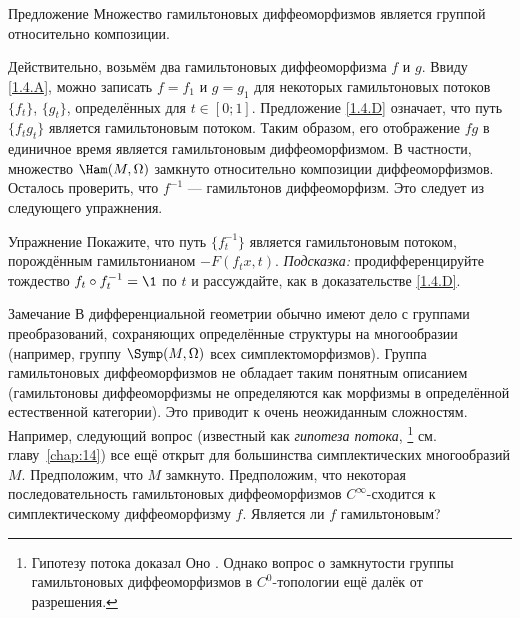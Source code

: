 \begin{thm}{Предложение}
Множество гамильтоновых диффеоморфизмов является группой относительно композиции.
\end{thm}

Действительно, возьмём два гамильтоновых диффеоморфизма $f$ и $g$.
Ввиду \ref{1.4.A}, можно записать $f = f_1$ и $g = g_1$ для некоторых гамильтоновых потоков $\{f_t\}$, $\{g_t\}$, определённых для $t \in [0; 1]$.
Предложение \ref{1.4.D} означает, что путь $\{f_t g_t\}$ является гамильтоновым потоком.
Таким образом, его отображение $f g$ в единичное время является гамильтоновым диффеоморфизмом.
В частности, множество $\Ham (M, \Omega)$ замкнуто относительно композиции диффеоморфизмов.
Осталось проверить, что $f^{-1}$ — гамильтонов диффеоморфизм.
Это следует из следующего упражнения.

\begin{ex*}{Упражнение} Покажите, что путь $\{f_t^{-1}\}$ является гамильтоновым потоком, порождённым гамильтонианом $-F (f_t x, t)$.
\emph{Подсказка:} продифференцируйте тождество $f_t \circ f_t^{-1} = \1$ по $t$ и рассуждайте, как в доказательстве \ref{1.4.D}.
\end{ex*}

\begin{ex}{Замечание}\label{1.4.F}
В дифференциальной геометрии обычно имеют дело с группами
преобразований, сохраняющих определённые структуры на многообразии
(например, группу $\Symp(M,\Omega)$ всех симплектоморфизмов).
Группа гамильтоновых диффеоморфизмов не обладает таким понятным
описанием (гамильтоновы диффеоморфизмы не определяются как морфизмы в
определённой естественной категории).
Это приводит к очень неожиданным сложностям. 
Например, следующий вопрос (известный как \emph{гипотеза потока},%
\footnote{
Гипотезу потока доказал Оно \cite{O06}.
Однако вопрос о замкнутости группы гамильтоновых диффеоморфизмов в $C^{0}$-топологии
ещё далёк от разрешения.\dpp}
см. главу~\ref{chap:14}) все ещё
открыт для большинства симплектических многообразий $M$.
Предположим, что $M$ замкнуто.
Предположим, что некоторая последовательность гамильтоновых
диффеоморфизмов $C^\infty$-сходится к симплектическому диффеоморфизму
$f$.
Является ли $f$ гамильтоновым?
\end{ex}

